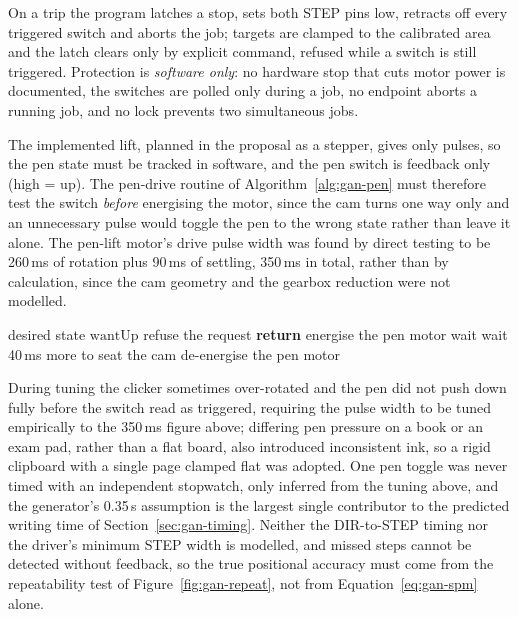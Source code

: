 On a trip the program latches a stop, sets both STEP pins low, retracts off every triggered switch and aborts the job; targets are clamped to the calibrated area and the latch clears only by explicit command, refused while a switch is still triggered. Protection is \emph{software only}: no hardware stop that cuts motor power is documented, the switches are polled only during a job, no endpoint aborts a running job, and no lock prevents two simultaneous jobs.

The implemented lift, planned in the proposal as a stepper, gives only pulses, so the pen state must be tracked in software, and the pen switch is feedback only (high = up). The pen-drive routine of Algorithm~\ref{alg:gan-pen} must therefore test the switch \emph{before} energising the motor, since the cam turns one way only and an unnecessary pulse would toggle the pen to the wrong state rather than leave it alone. The pen-lift motor's drive pulse width was found by direct testing to be 260\,ms of rotation plus 90\,ms of settling, 350\,ms in total, rather than by calculation, since the cam geometry and the gearbox reduction were not modelled.

\begin{algorithm}[!htbp]
\caption{Pen toggle}
\label{alg:gan-pen}
\begin{algorithmic}[1]
\REQUIRE desired state $\mathrm{wantUp}$
    \STATE refuse the request
    \STATE \textbf{return} 
\ELSE
    \STATE energise the pen motor
        \STATE wait
    \ENDWHILE
        \STATE wait 40\,ms more to seat the cam
    \ENDIF
    \STATE de-energise the pen motor
\ENDIF
\end{algorithmic}
\end{algorithm}

During tuning the clicker sometimes over-rotated and the pen did not push down fully before the switch read as triggered, requiring the pulse width to be tuned empirically to the 350\,ms figure above; differing pen pressure on a book or an exam pad, rather than a flat board, also introduced inconsistent ink, so a rigid clipboard with a single page clamped flat was adopted. One pen toggle was never timed with an independent stopwatch, only inferred from the tuning above, and the generator's 0.35\,s assumption is the largest single contributor to the predicted writing time of Section~\ref{sec:gan-timing}. Neither the DIR-to-STEP timing nor the driver's minimum STEP width is modelled, and missed steps cannot be detected without feedback, so the true positional accuracy must come from the repeatability test of Figure~\ref{fig:gan-repeat}, not from Equation~\ref{eq:gan-spm} alone.


